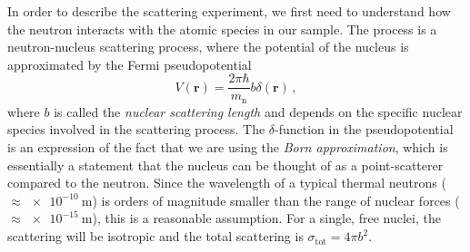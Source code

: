 In order to describe the scattering experiment, we first need to understand how the neutron interacts with the atomic species in our sample. The process is a neutron-nucleus scattering process, where the potential of the nucleus is approximated by the Fermi pseudopotential
%
\begin{equation}\label{eq:fermi_pseudopotential}
V(\bm{r}) = \frac{2\pi \hbar}{m_\text{n}} b \delta (\bm{r}) \, ,
\end{equation}
%
where $b$ is called the \emph{nuclear scattering length} and depends on the specific nuclear species involved in the scattering process. The $\delta$-function in the pseudopotential is an expression of the fact that we are using the \emph{Born approximation}, which is essentially a statement that the nucleus can be thought of as a point-scatterer compared to the neutron. Since the wavelength of a typical thermal neutrons ($\approx \SI{e-10}{\meter}$) is orders of magnitude smaller than the range of nuclear forces ($\approx \SI{e-15}{\meter}$), this is a reasonable assumption. For a single, free nuclei, the scattering will be isotropic and the total scattering is $\sigma_\text{tot} = 4\pi b^2$.

